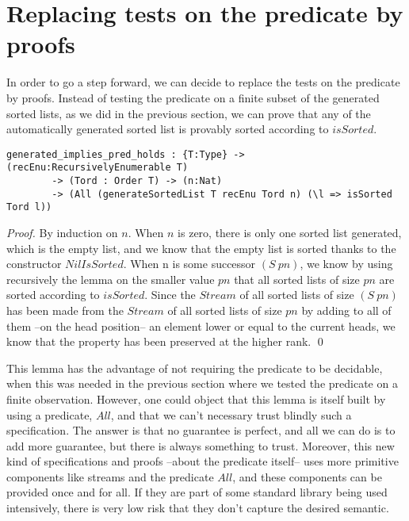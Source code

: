 \section{Replacing tests on the predicate by proofs}

\label{sect:aStepForward}

In order to go a step forward, we can decide to replace the tests on the predicate by proofs. Instead of testing the predicate on a finite subset of the generated sorted lists, as we did in the previous section, we can prove that any of the automatically generated sorted list is provably sorted according to $isSorted$.

\begin{lstlisting}
generated_implies_pred_holds : {T:Type} -> (recEnu:RecursivelyEnumerable T) 
        -> (Tord : Order T) -> (n:Nat) 
        -> (All (generateSortedList T recEnu Tord n) (\l => isSorted Tord l))
\end{lstlisting}
\begin{proof}
By induction on $n$.
When $n$ is zero, there is only one sorted list generated, which is the empty list, and we know that the empty list is sorted thanks to the constructor $NilIsSorted$. When n is some successor $(S\ pn)$, we know by using recursively the lemma on the smaller value $pn$ that all sorted lists of size $pn$ are sorted according to $isSorted$. Since the $Stream$ of all sorted lists of size $(S\ pn)$ has been made from the $Stream$ of all sorted lists of size $pn$ by adding to all of them --on the head position-- an element lower or equal to the current heads, we know that the property has been preserved at the higher rank.
\qed
\end{proof}

This lemma has the advantage of not requiring the predicate to be decidable, when this was needed in the previous section where we tested the predicate on a finite observation. However, one could object that this lemma is itself built by using a predicate, $All$, and that we can't necessary trust blindly such a specification. The answer is that no guarantee is perfect, and all we can do is to add more guarantee, but there is always something to trust. Moreover, this new kind of specifications and proofs --about the predicate itself-- uses more primitive components like streams and the predicate $All$, and these components can be provided once and for all. If they are part of some standard library being used intensively, there is very low risk that they don't capture the desired semantic.

